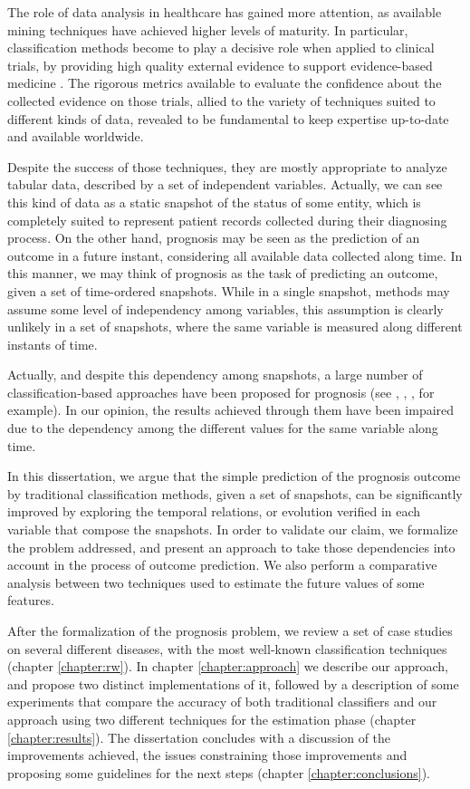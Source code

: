 The role of data analysis in healthcare has gained more attention, as available mining techniques have achieved higher levels of maturity.
 In particular, classification methods become to play a decisive role when applied to clinical trials, by providing high quality external 
 evidence to support evidence-based medicine \cite{Sackett1996}. The rigorous metrics available to evaluate the confidence about the collected evidence 
 on those trials, allied to the variety of techniques suited to different kinds of data, revealed to be fundamental to keep expertise 
 up-to-date and available worldwide.

Despite the success of those techniques, they are mostly appropriate to analyze tabular data, described by a set of independent variables.
 Actually, we can see this kind of data as a static snapshot of the status of some entity, which is completely suited to represent patient
 records collected during their diagnosing process. On the other hand, prognosis may be seen as the prediction of an outcome in a future 
 instant, considering all available data collected along time. In this manner, we may think of prognosis as the task of predicting an
 outcome, given a set of time-ordered snapshots. While in a single snapshot, methods may assume some level of independency among
 variables, this assumption is clearly unlikely in a set of snapshots, where the same variable is measured along different instants of time. 

Actually, and despite this dependency among snapshots, a large number of classification-based approaches have been proposed for prognosis
 (see \cite{Endo2008}, \cite{Paradise2009}, \cite{Zhou2011}, for example). In our opinion, the results achieved through them have been
 impaired due to the dependency among the  different values for the same variable along time. 

In this dissertation, we argue that the simple prediction of the prognosis outcome by traditional classification methods, given a set of
 snapshots, can be significantly improved by exploring the temporal relations, or evolution verified in each variable that compose 
 the snapshots. In order to validate our claim, we formalize the problem addressed, and present an approach to take those dependencies
 into account in the process of outcome prediction. We also perform a comparative analysis between two techniques used to estimate 
 the future values of some features.

After the formalization of the prognosis problem, we review a set of case studies on several different diseases, with the most 
well-known classification techniques (chapter \ref{chapter:rw}). In chapter \ref{chapter:approach} we describe our approach, and propose two distinct implementations of it, followed by a description of some experiments that compare the accuracy of both traditional classifiers and our approach 
 using two different techniques for the estimation phase (chapter \ref{chapter:results}). The dissertation concludes with a discussion of the improvements achieved, the issues constraining those improvements and proposing some guidelines for the next steps (chapter \ref{chapter:conclusions}).

\cleardoublepage